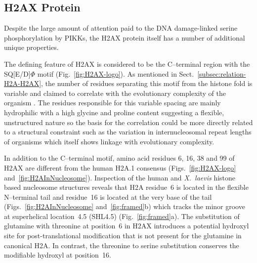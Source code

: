 \documentclass[graybox]{svmult}
\begin{document}
\subsection{H2AX Protein}
\label{subsec:H2AX-protein}
Despite the large amount of attention paid to the DNA damage-linked serine phosphorylation by PIKKs,
the H2AX protein itself has a number of additional unique properties.

The defining feature of H2AX is considered to be the C--terminal region with the SQ[E/D]$\varPhi$ motif
(Fig.~\ref{fig:H2AX-logo}). As mentioned in Sect.~\ref{subsec:relation-H2A-H2AX}, the number of
residues separating this motif from the histone fold is variable and claimed to correlate with the
evolutionary complexity of the organism \cite{CRDP+02}. The residues responsible for this variable
spacing are mainly hydrophilic with a high glycine and proline content suggesting a flexible,
unstructured nature so the basis for the correlation could be more directly related to a structural
constraint such as the variation in internucleosomal repeat lengths of organisms which itself shows
linkage with evolutionary complexity.

In addition to the C--terminal motif, amino acid residues 6, 16, 38 and 99 of H2AX are different
from the human H2A.1 consensus (Figs.~\ref{fig:H2AX-logo} and~\ref{fig:H2AInNucleosome}). Inspection
of the human and \emph{X.\ laevis} histone based nucleosome structures reveals that H2A residue~6 is
located in the flexible N--terminal tail and residue~16 is located at the very base of the tail
(Figs.~\ref{fig:H2AInNucleosome} and~\ref{fig:framed}b) which tracks the minor groove at superhelical
location~4.5 (SHL4.5) (Fig.~\ref{fig:framed}a). The substitution of glutamine with threonine at
position~6 in H2AX introduces a potential hydroxyl site for post-translational modification that is
not present for the glutamine in canonical H2A. In contrast, the threonine to serine substitution
conserves the modifiable hydroxyl at position~16.
\end{document}
